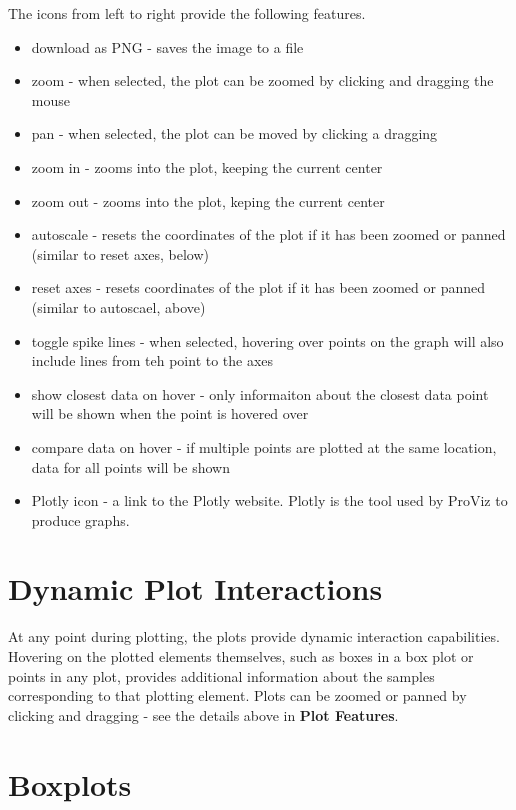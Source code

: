 \documentclass[
]{book}
\providecommand{\tightlist}{%
  \setlength{\itemsep}{0pt}\setlength{\parskip}{0pt}}
\begin{document}
The icons from left to right provide the following features.

\begin{itemize}
\tightlist
\item
  download as PNG - saves the image to a file
\item
  zoom - when selected, the plot can be zoomed by clicking and dragging the mouse
\item
  pan - when selected, the plot can be moved by clicking a dragging
\item
  zoom in - zooms into the plot, keeping the current center
\item
  zoom out - zooms into the plot, keping the current center
\item
  autoscale - resets the coordinates of the plot if it has been zoomed or panned (similar to reset axes, below)
\item
  reset axes - resets coordinates of the plot if it has been zoomed or panned (similar to autoscael, above)
\item
  toggle spike lines - when selected, hovering over points on the graph will also include lines from teh point to the axes
\item
  show closest data on hover - only informaiton about the closest data point will be shown when the point is hovered over
\item
  compare data on hover - if multiple points are plotted at the same location, data for all points will be shown
\item
  Plotly icon - a link to the Plotly website. Plotly is the tool used by ProViz to produce graphs.
\end{itemize}

\hypertarget{dynamic-plot-interactions}{%
\section{Dynamic Plot Interactions}\label{dynamic-plot-interactions}}

At any point during plotting, the plots provide dynamic interaction capabilities. Hovering on the plotted elements themselves, such as boxes in a box plot or points in any plot, provides additional information about the samples corresponding to that plotting element. Plots can be zoomed or panned by clicking and dragging - see the details above in \textbf{Plot Features}.

\hypertarget{boxplots}{%
\section{Boxplots}\label{boxplots}}
\end{document}
